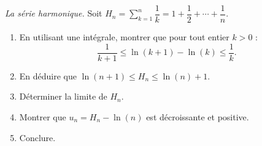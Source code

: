 \documentclass[solutions]{exercices}
\begin{document}
\newcommand{\e}{\mathrm{e}}


\begin{exercice}[\di] \emph{La série harmonique.}
	Soit $H_n =\sum\limits_{k=1}^n\dfrac1k= 1 + \dfrac12 + \cdots + \dfrac1n$.
	\begin{enumerate}
		\item En utilisant une intégrale, montrer que pour tout entier $k>0$ : 
			\[
				\dfrac1{k + 1} \leq \ln (k + 1)-\ln (k) \leq \dfrac1k.
			\]
		\item En déduire que $\ln (n + 1) \leq H_n \leq \ln (n) + 1$.
		\item Déterminer la limite de $H_n$.
		\item Montrer que $u_n = H_n-\ln (n)$ est décroissante et positive.
		\item Conclure.
	\end{enumerate}
\end{exercice}
\end{document}
